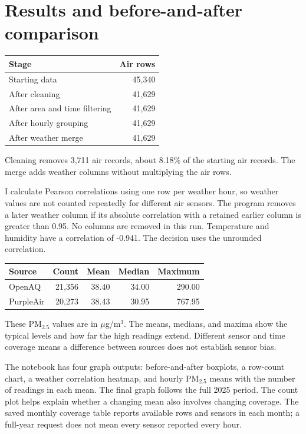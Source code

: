 \documentclass[11pt,a4paper]{article}
\begin{document}
\section{Results and before-and-after comparison}
\begin{center}
\begin{tabular}{lr}\toprule
Stage & Air rows \\\midrule
Starting data & 45,340 \\
After cleaning & 41,629 \\
After area and time filtering & 41,629 \\
After hourly grouping & 41,629 \\
After weather merge & 41,629 \\\bottomrule
\end{tabular}
\end{center}
Cleaning removes 3,711 air records, about 8.18\% of the starting air records. The merge adds weather columns without multiplying the air rows.

I calculate Pearson correlations using one row per weather hour, so weather values are not counted repeatedly for different air sensors. The program removes a later weather column if its absolute correlation with a retained earlier column is greater than 0.95. No columns are removed in this run. Temperature and humidity have a correlation of -0.941. The decision uses the unrounded correlation.
\begin{center}
\begin{tabular}{lrrrr}\toprule
Source & Count & Mean & Median & Maximum \\\midrule
OpenAQ & 21,356 & 38.40 & 34.00 & 290.00 \\
PurpleAir & 20,273 & 38.43 & 30.95 & 767.95 \\
\bottomrule
\end{tabular}
\end{center}
These PM$_{2.5}$ values are in $\mu$g/m$^3$. The means, medians, and maxima show the typical levels and how far the high readings extend. Different sensor and time coverage means a difference between sources does not establish sensor bias.

The notebook has four graph outputs: before-and-after boxplots, a row-count chart, a weather correlation heatmap, and hourly PM$_{2.5}$ means with the number of readings in each mean. The final graph follows the full 2025 period. The count plot helps explain whether a changing mean also involves changing coverage. The saved monthly coverage table reports available rows and sensors in each month; a full-year request does not mean every sensor reported every hour.
\end{document}
